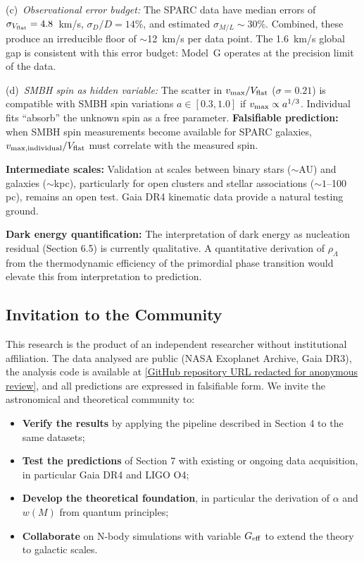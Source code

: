 \documentclass[10pt,a4paper]{article}
\providecommand{\tightlist}{\setlength{\itemsep}{0pt}\setlength{\parskip}{0pt}}
\begin{document}
(c)~\textit{Observational error budget:} The SPARC data have median errors of $\sigma_{V_{\rm flat}} = 4.8$~km/s, $\sigma_D/D = 14\%$, and estimated $\sigma_{M/L} \sim 30\%$. Combined, these produce an irreducible floor of $\sim$12~km/s per data point. The 1.6~km/s global gap is consistent with this error budget: Model~G operates at the precision limit of the data.

(d)~\textit{SMBH spin as hidden variable:} The scatter in $v_{\rm max}/V_{\rm flat}$ ($\sigma = 0.21$) is compatible with SMBH spin variations $a \in [0.3, 1.0]$ if $v_{\rm max} \propto a^{1/3}$. Individual fits ``absorb'' the unknown spin as a free parameter. \textbf{Falsifiable prediction:} when SMBH spin measurements become available for SPARC galaxies, $v_{\rm max,individual}/V_{\rm flat}$ must correlate with the measured spin.

\textbf{Intermediate scales:} Validation at scales between binary stars (\(\sim\)AU) and galaxies (\(\sim\)kpc), particularly for open clusters and stellar associations (\(\sim 1\)--100 pc), remains an open test. Gaia DR4 kinematic data provide a natural testing ground.

\textbf{Dark energy quantification:} The interpretation of dark energy as nucleation residual (Section 6.5) is currently qualitative. A quantitative derivation of \(\rho_\Lambda\) from the thermodynamic efficiency of the primordial phase transition would elevate this from interpretation to prediction.

\subsection{Invitation to the
Community}\label{invitation-to-the-community}

This research is the product of an independent researcher without
institutional affiliation. The data analysed are public (NASA Exoplanet
Archive, Gaia DR3), the analysis code is available at \url{[GitHub repository URL redacted for anonymous review]}, and all predictions are expressed in
falsifiable form. We invite the astronomical and theoretical community
to:

\begin{itemize}
\tightlist
\item
  \textbf{Verify the results} by applying the pipeline described in
  Section 4 to the same datasets;
\item
  \textbf{Test the predictions} of Section 7 with existing or ongoing
  data acquisition, in particular Gaia DR4 and LIGO O4;
\item
  \textbf{Develop the theoretical foundation}, in particular the
  derivation of \(\alpha\) and \(w(M)\) from quantum principles;
\item
  \textbf{Collaborate} on N-body simulations with variable
  \(G_{\rm eff}\) to extend the theory to galactic scales.
\end{itemize}
\end{document}
